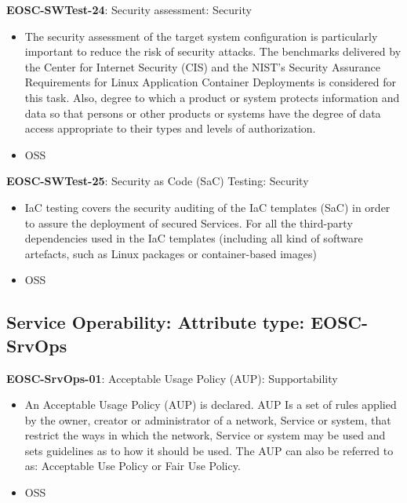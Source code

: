 \textbf{EOSC-SWTest-24}: Security assessment: Security

\begin{itemize}
    \item The security assessment of the target system configuration is particularly important to reduce the risk of security attacks. The benchmarks delivered by the Center for Internet Security (CIS) and the NIST's Security Assurance Requirements for Linux Application Container Deployments is considered for this task. Also, degree to which a product or system protects information and data so that persons or other products or
systems have the degree of data access appropriate to their types and levels of authorization. \cite{iso_25010_2011_2017,orviz_fernandez_eosc-synergy_2020}
    \item OSS
\end{itemize}

\textbf{EOSC-SWTest-25}: Security as Code (SaC) Testing: Security

\begin{itemize}
    \item IaC testing covers the security auditing of the IaC templates (SaC) in order to assure the deployment of secured Services. For all the third-party dependencies used in the IaC templates (including all kind of software artefacts, such as Linux packages or container-based images) \cite{orviz_fernandez_eosc-synergy_2020}
    \item OSS
\end{itemize}

\subsection{Service Operability: Attribute type: EOSC-SrvOps}

\textbf{EOSC-SrvOps-01}: Acceptable Usage Policy (AUP): Supportability

\begin{itemize}
    \item An Acceptable Usage Policy (AUP) is declared. AUP Is a set of rules applied by the owner, creator or administrator of a network, Service or system, that restrict the ways in which the network, Service or system may be used and sets guidelines as to how it should be used. The AUP can also be referred to as: Acceptable Use Policy or Fair Use Policy. \cite{orviz_fernandez_eosc-synergy_2020}
    \item OSS
\end{itemize}

